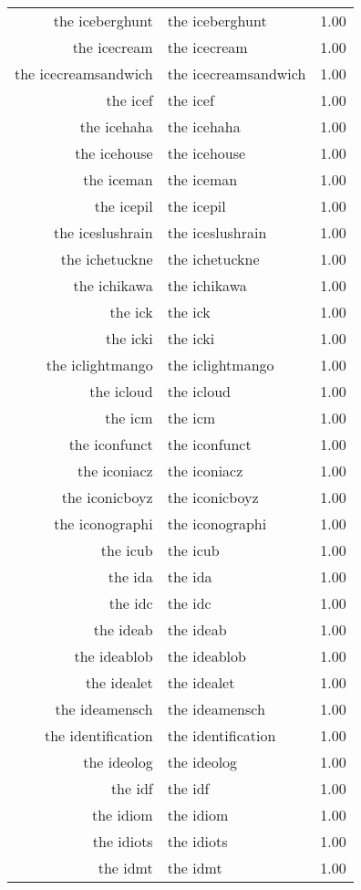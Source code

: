 \begin{table}[ht]
\begin{tabular}{rlr}
  the iceberghunt & the iceberghunt & 1.00 \\ 
  the icecream & the icecream & 1.00 \\ 
  the icecreamsandwich & the icecreamsandwich & 1.00 \\ 
  the icef & the icef & 1.00 \\ 
  the icehaha & the icehaha & 1.00 \\ 
  the icehouse & the icehouse & 1.00 \\ 
  the iceman & the iceman & 1.00 \\ 
  the icepil & the icepil & 1.00 \\ 
  the iceslushrain & the iceslushrain & 1.00 \\ 
  the ichetuckne & the ichetuckne & 1.00 \\ 
  the ichikawa & the ichikawa & 1.00 \\ 
  the ick & the ick & 1.00 \\ 
  the icki & the icki & 1.00 \\ 
  the iclightmango & the iclightmango & 1.00 \\ 
  the icloud & the icloud & 1.00 \\ 
  the icm & the icm & 1.00 \\ 
  the iconfunct & the iconfunct & 1.00 \\ 
  the iconiacz & the iconiacz & 1.00 \\ 
  the iconicboyz & the iconicboyz & 1.00 \\ 
  the iconographi & the iconographi & 1.00 \\ 
  the icub & the icub & 1.00 \\ 
  the ida & the ida & 1.00 \\ 
  the idc & the idc & 1.00 \\ 
  the ideab & the ideab & 1.00 \\ 
  the ideablob & the ideablob & 1.00 \\ 
  the idealet & the idealet & 1.00 \\ 
  the ideamensch & the ideamensch & 1.00 \\ 
  the identification & the identification & 1.00 \\ 
  the ideolog & the ideolog & 1.00 \\ 
  the idf & the idf & 1.00 \\ 
  the idiom & the idiom & 1.00 \\ 
  the idiots & the idiots & 1.00 \\ 
  the idmt & the idmt & 1.00 \\ 

\end{tabular}
\end{table}
